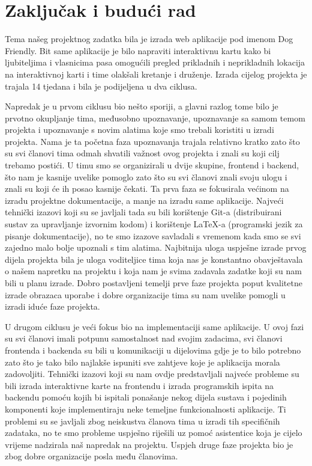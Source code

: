 \chapter{Zaključak i budući rad}

        Tema našeg projektnog zadatka bila je izrada web aplikacije pod imenom Dog Friendly. Bit same aplikacije je bilo napraviti interaktivnu kartu kako bi ljubiteljima i vlasnicima pasa omogućili pregled prikladnih i neprikladnih lokacija na interaktivnoj karti i time olakšali kretanje i druženje. Izrada cijelog projekta je trajala 14 tjedana i bila je podijeljena u dva ciklusa.

        Napredak je u prvom ciklusu bio nešto sporiji, a glavni razlog tome bilo je prvotno okupljanje tima, međusobno upoznavanje, upoznavanje sa samom temom projekta i upoznavanje s novim alatima koje smo trebali koristiti u izradi projekta. Nama je ta početna faza upoznavanja trajala relativno kratko zato što su svi članovi tima odmah shvatili važnost ovog projekta i znali su koji cilj trebamo postići. U timu smo se organizirali u dvije skupine, frontend i backend, što nam je kasnije uvelike pomoglo zato što su svi članovi znali svoju ulogu i znali su koji će ih posao kasnije čekati. Ta prva faza se fokusirala većinom na izradu projektne dokumentacije, a manje na izradu same aplikacije. Najveći tehnički izazovi koji su se javljali tada su bili korištenje Git-a (distribuirani sustav za upravljanje izvornim kodom) i korištenje LaTeX-a (programski jezik za pisanje dokumentacije), no te smo izazove savladali s vremenom kada smo se svi zajedno malo bolje upoznali s tim alatima. Najbitnija uloga uspješne izrade prvog dijela projekta bila je uloga voditeljice tima koja nas je konstantno obavještavala o našem napretku na projektu i koja nam je svima zadavala zadatke koji su nam bili u planu izrade. Dobro postavljeni temelji prve faze projekta poput kvalitetne izrade obrazaca uporabe i dobre organizacije tima su nam uvelike pomogli u izradi iduće faze projekta.
        
        U drugom ciklusu je veći fokus bio na implementaciji same aplikacije. U ovoj fazi su svi članovi imali potpunu samostalnost nad svojim zadacima, svi članovi frontenda i backenda su bili u komunikaciji u dijelovima gdje je to bilo potrebno zato što je tako bilo najlakše ispuniti sve zahtjeve koje je aplikacija morala zadovoljiti. Tehnički izazovi koji su nam ovdje predstavljali najveće probleme su bili izrada interaktivne karte na frontendu i izrada programskih ispita na backendu pomoću kojih bi ispitali ponašanje nekog dijela sustava i pojedinih komponenti koje implementiraju neke temeljne funkcionalnosti aplikacije. Ti problemi su se javljali zbog neiskustva članova tima u izradi tih specifičnih zadataka, no te smo probleme uspješno riješili uz pomoć asistentice koja je cijelo vrijeme nadzirala naš napredak na projektu. Uspjeh druge faze projekta bio je zbog dobre organizacije posla među članovima.
        
